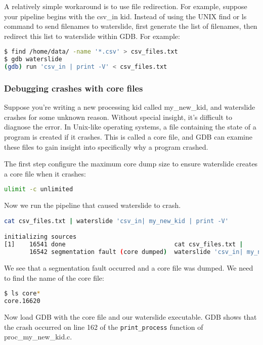 \documentclass[11pt]{article}
\begin{document}
A relatively simple workaround is to use file redirection. For example,
suppose your pipeline begins with the csv\_in kid. Instead of using the UNIX find
or ls command to send filenames to waterslide, first generate the list of
filenames, then redirect this list to waterslide within GDB. For example:  

\begin{lstlisting}[language=bash]
$ find /home/data/ -name '*.csv' > csv_files.txt
$ gdb waterslide
(gdb) run 'csv_in | print -V' < csv_files.txt
\end{lstlisting}

\subsubsection{Debugging crashes with core files}

Suppose you're writing a new processing kid called my\_new\_kid, and waterslide
crashes for some unknown reason. Without special insight, it's difficult to
diagnose the error. In Unix-like operating systems, a file containing the
state of a program is created if it crashes. This is called a core file, and
GDB can examine these files to gain insight into specifically why a program
crashed.

The first step configure the maximum core dump size to ensure waterslide creates 
a core file when it crashes: 

\begin{lstlisting}[language=bash]
ulimit -c unlimited
\end{lstlisting}

Now we run the pipeline that caused waterslide to crash. 

\begin{lstlisting}[language=bash]
cat csv_files.txt | waterslide 'csv_in| my_new_kid | print -V'

initializing sources
[1]    16541 done                              cat csv_files.txt |
       16542 segmentation fault (core dumped)  waterslide 'csv_in| my_new_kid |
\end{lstlisting}

We see that a segmentation fault occurred and a core file was dumped. We need
to find the name of the core file:

\begin{lstlisting}[language=bash]
$ ls core*
core.16620
\end{lstlisting}

Now load GDB with the core file and our waterslide executable. GDB shows that the
crash occurred on line 162 of the \texttt{print\_process} function  of 
proc\_my\_new\_kid.c.
\end{document}
